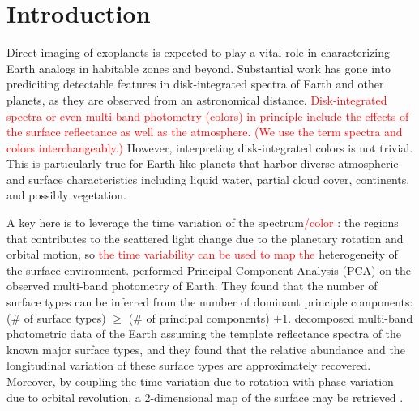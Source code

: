 \documentclass[iop,numberedappendix,apj]{emulateapj}
\def\edit#1{\textcolor{red}{#1}}
\begin{document}
  



\section{Introduction}
\label{sec:intro}

Direct imaging of exoplanets is expected to play a vital role in characterizing Earth analogs in habitable zones and beyond. 
Substantial work has gone into prediciting detectable features in disk-integrated spectra of Earth and other planets, as they are observed from an astronomical distance. 
\edit{Disk-integrated spectra or even multi-band photometry (colors) in principle include the effects of the surface reflectance as well as the atmosphere. (We use the term spectra and colors interchangeably.) }
However, interpreting disk-integrated colors is not trivial. 
This is particularly true for Earth-like planets that harbor diverse atmospheric and surface characteristics including liquid water, partial cloud cover, continents, and possibly vegetation. 

A key here is to leverage the time variation of the spectrum\edit{/color}  \citep{Ford2001}: the regions that contributes to the scattered light change due to the planetary rotation and  orbital motion, so \edit{the time variability can be used to map the} heterogeneity of the surface environment.  
\citet{Cowan2009, Cowan2011} performed Principal Component Analysis (PCA) on the observed multi-band photometry of Earth. They found that the number of surface types can be inferred from the number of dominant principle components: (\# of surface types) $\ge $ (\# of principal components) $+ 1$. %
\citet{Fujii2010, Fujii2011} decomposed multi-band photometric data of the Earth assuming the template reflectance spectra of the known major surface types, and they found that the relative abundance and the longitudinal variation of these surface types are approximately recovered. 
Moreover, by coupling the time variation due to rotation with phase variation due to orbital revolution, a 2-dimensional map of the surface may be retrieved \citep{Kawahara2010, Kawahara2011, Fujii2012}. 
\end{document}
